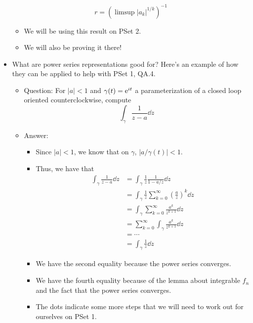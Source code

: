 \documentclass[../notes.tex]{subfiles}
\begin{document}
\begin{itemize}
    \begin{equation*}
        r = (\limsup|a_k|^{1/k})^{-1}
    \end{equation*}
    \begin{itemize}
        \item We will be using this result on PSet 2.
        \item We will also be proving it there!
    \end{itemize}
    \item What are power series representations good for? Here's an example of how they can be applied to help with PSet 1, QA.4.
    \begin{itemize}
        \item Question: For $|a|<1$ and $\gamma(t)=\e[it]$ a parameterization of a closed loop oriented counterclockwise, compute
        \begin{equation*}
            \int_\gamma\frac{1}{z-a}\dd{z}
        \end{equation*}
        \item Answer:
        \begin{itemize}
            \item Since $|a|<1$, we know that on $\gamma$, $|a/\gamma(t)|<1$.
            \item Thus, we have that
            \begin{align*}
                \int_\gamma\frac{1}{z-a}\dd{z} &= \int_\gamma\frac{1}{z}\frac{1}{1-a/z}\dd{z}\\
                &= \int_\gamma\frac{1}{z}\sum_{k=0}^\infty\left( \frac{a}{z} \right)^k\dd{z}\\
                &= \int_\gamma\sum_{k=0}^\infty\frac{a^k}{z^{k+1}}\dd{z}\\
                &= \sum_{k=0}^\infty\int_\gamma\frac{a^k}{z^{k+1}}\dd{z}\\
                &= \cdots\\
                &= \int_\gamma\frac{1}{z}\dd{z}
            \end{align*}
            \item We have the second equality because the power series converges.
            \item We have the fourth equality because of the lemma about integrable $f_n$ and the fact that the power series converges.
            \item The dots indicate some more steps that we will need to work out for ourselves on PSet 1.
        \end{itemize}

\end{itemize}
\end{itemize}
\end{document}
